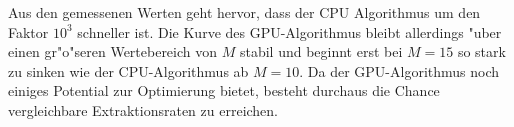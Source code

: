 Aus den gemessenen Werten geht hervor, dass der CPU Algorithmus um den Faktor $10^3$ schneller ist. Die Kurve des GPU-Algorithmus bleibt allerdings "uber einen gr"o"seren Wertebereich von $M$ stabil und beginnt erst bei $M=15$ so stark zu sinken wie der CPU-Algorithmus ab $M=10$. Da der GPU-Algorithmus noch einiges Potential zur Optimierung bietet, besteht durchaus die Chance vergleichbare Extraktionsraten zu erreichen.
